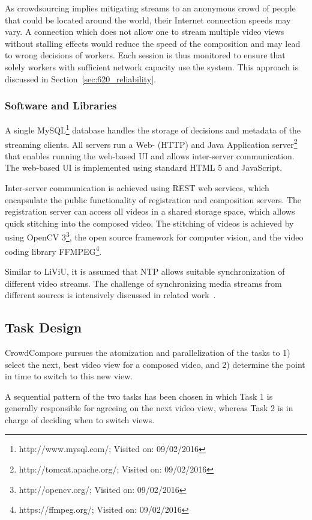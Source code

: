 As crowdsourcing implies mitigating streams to an anonymous crowd of people that could be located around the world, their Internet connection speeds may vary.
A connection which does not allow one to stream multiple video views without stalling effects would reduce the speed of the composition and may lead to wrong decisions of workers. 
Each session is thus monitored to ensure that solely workers with sufficient network capacity use the system.
This approach is discussed in Section~\ref{sec:620_reliability}.
\subsubsection{Software and Libraries}
A single MySQL\footnote{http://www.mysql.com/; Visited on: 09/02/2016} database handles the storage of decisions and metadata of the streaming clients.
All servers run a Web- (\ac{HTTP}) and Java Application server\footnote{http://tomcat.apache.org/; Visited on: 09/02/2016} that enables running the web-based \ac{UI} and allows inter-server communication.
The web-based \ac{UI} is implemented using standard \ac{HTML} 5 and JavaScript.

Inter-server communication is achieved using \ac{REST} web services, which encapsulate the public functionality of registration and composition servers.
The registration server can access all videos in a shared storage space, which allows quick stitching into the composed video.
The stitching of videos is achieved by using OpenCV 3\footnote{http://opencv.org/; Visited on: 09/02/2016}, the open source framework for computer vision, and the video coding library FFMPEG\footnote{https://ffmpeg.org/; Visited on: 09/02/2016}.

Similar to \ac{LiViU}, it is assumed that \ac{NTP} allows suitable synchronization of different video streams.
The challenge of synchronizing media streams from different sources is intensively discussed in related work~\cite{Guggenberger2015a,Guggenberger2015,Shrestha2007,Shrestha2010b}.
\subsection{Task Design}
\label{sec:620_task_desc}
CrowdCompose pursues the atomization and parallelization of the tasks to 1) select the next, best video view for a composed video, and 2) determine the point in time to switch to this new view. 

A sequential pattern of the two tasks has been chosen in which Task 1 is generally responsible for agreeing on the next video view, whereas Task 2 is in charge of deciding when to switch views. 
